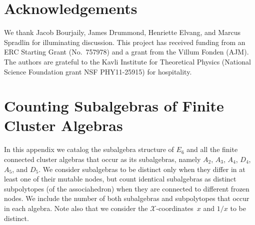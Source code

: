 \documentclass[11pt]{article}
\def\xcoords{$\mathcal{X}$-coordinates}
\begin{document}
\section*{Acknowledgements}

We thank Jacob Bourjaily, James Drummond, Henriette Elvang, and Marcus Spradlin for illuminating discussion. This project has received funding from an ERC Starting Grant \mbox{(No.\ 757978)} and a grant from the Villum Fonden (AJM). The authors are grateful to the Kavli Institute for Theoretical Physics (National Science Foundation grant NSF PHY11-25915) for hospitality. 


\appendix

\newpage

\section{Counting Subalgebras of Finite Cluster Algebras}\label{appendix:subalgebras}
In this appendix we catalog the subalgebra structure of $E_6$ and all the finite connected cluster algebras that occur as its subalgebras, namely $A_2$, $A_3$, $A_4$, $D_4$, $A_5$, and $D_5$. We consider subalgebras to be distinct only when they differ in at least one of their mutable nodes, but count identical subalgebras as distinct subpolytopes (of the associahedron) when they are connected to different frozen nodes. We include the number of both subalgebras and subpolytopes that occur in each algebra. Note also that we consider the \xcoords\ $x$ and $1/x$ to be distinct.
\end{document}

